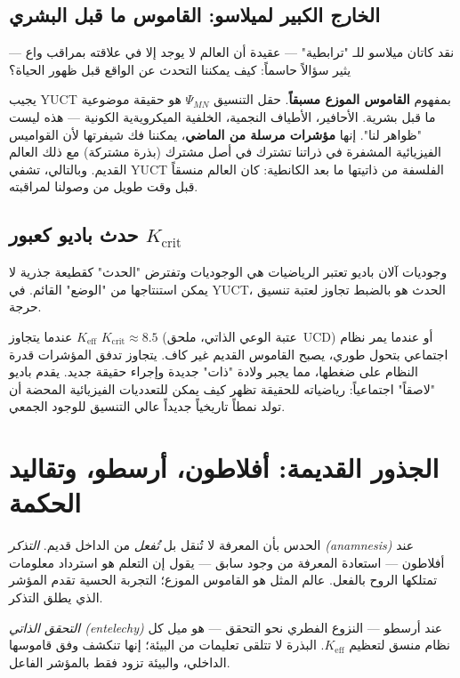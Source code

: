 \documentclass[12pt,a4paper]{article}
\newcommand{\Keff}{K_{\mathrm{eff}}}
\begin{document}
	\subsection{الخارج الكبير لميلاسو: القاموس ما قبل البشري}
	
	نقد كاتان ميلاسو للـ "ترابطية" — عقيدة أن العالم لا يوجد إلا في علاقته بمراقب واع — يثير سؤالاً حاسماً: كيف يمكننا التحدث عن الواقع قبل ظهور الحياة؟
	
	يجيب YUCT بمفهوم \textbf{القاموس الموزع مسبقاً}. حقل التنسيق \(\Psi_{MN}\) هو حقيقة موضوعية ما قبل بشرية. الأحافير، الأطياف النجمية، الخلفية الميكرويةية الكونية — هذه ليست "ظواهر لنا". إنها \textbf{مؤشرات مرسلة من الماضي}، يمكننا فك شيفرتها لأن القواميس الفيزيائية المشفرة في ذراتنا تشترك في أصل مشترك (بذرة مشتركة) مع ذلك العالم القديم. وبالتالي، تشفي YUCT الفلسفة من ذاتيتها ما بعد الكانطية: كان العالم منسقاً قبل وقت طويل من وصولنا لمراقبته.
	
	\subsection{حدث باديو كعبور \(K_{\mathrm{crit}}\)}
	
	وجوديات آلان باديو تعتبر الرياضيات هي الوجوديات وتفترض "الحدث" كقطيعة جذرية لا يمكن استنتاجها من "الوضع" القائم. في YUCT، الحدث هو بالضبط تجاوز لعتبة تنسيق حرجة.
	
	عندما يتجاوز \(\Keff\) \(K_{\mathrm{crit}} \approx 8.5\) (عتبة الوعي الذاتي، ملحق~UCD) أو عندما يمر نظام اجتماعي بتحول طوري، يصبح القاموس القديم غير كاف. يتجاوز تدفق المؤشرات قدرة النظام على ضغطها، مما يجبر ولادة "ذات" جديدة وإجراء حقيقة جديد. يقدم باديو "لاصقاً" اجتماعياً: رياضياته للحقيقة تظهر كيف يمكن للتعدديات الفيزيائية المحضة أن تولد نمطاً تاريخياً جديداً عالي التنسيق للوجود الجمعي.
	
	\section{الجذور القديمة: أفلاطون، أرسطو، وتقاليد الحكمة}
	
	الحدس بأن المعرفة لا تُنقل بل \emph{تُفعل} من الداخل قديم. \emph{التذكر (anamnesis)} عند أفلاطون — استعادة المعرفة من وجود سابق — يقول إن التعلم هو استرداد معلومات تمتلكها الروح بالفعل. عالم المثل هو القاموس الموزع؛ التجربة الحسية تقدم المؤشر الذي يطلق التذكر.
	
	\emph{التحقق الذاتي (entelechy)} عند أرسطو — النزوع الفطري نحو التحقق — هو ميل كل نظام منسق لتعظيم \(K_{\mathrm{eff}}\). البذرة لا تتلقى تعليمات من البيئة؛ إنها تنكشف وفق قاموسها الداخلي، والبيئة تزود فقط بالمؤشر الفاعل.
	
\end{document}

